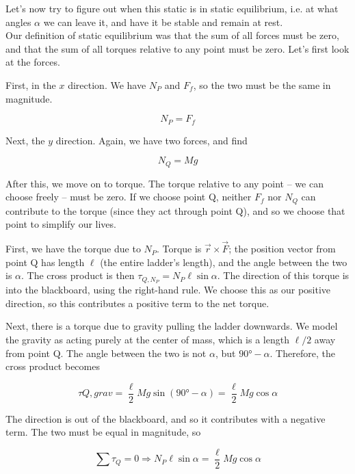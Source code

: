 Let's now try to figure out when this static is in static equilibrium, i.e. at what angles $\alpha$ we can leave it, and have it be stable and remain at rest.\\
Our definition of static equilibrium was that the sum of all forces must be zero, and that the sum of all torques relative to any point must be zero. Let's first look at the forces.

First, in the $x$ direction. We have $N_P$ and $F_f$, so the two must be the same in magnitude.

\begin{equation}
N_P = F_f
\end{equation}

Next, the $y$ direction. Again, we have two forces, and find

\begin{equation}
N_Q = M g
\end{equation}

After this, we move on to torque. The torque relative to any point -- we can choose freely -- must be zero. If we choose point Q, neither $F_f$ nor $N_Q$ can contribute to the torque (since they act through point Q), and so we choose that point to simplify our lives.

First, we have the torque due to $N_P$. Torque is $\vec{r} \times \vec{F}$; the position vector from point Q has length $\ell$ (the entire ladder's length), and the angle between the two is $\alpha$. The cross product is then $\tau_{Q,N_P} = N_P \ell \sin \alpha$. The direction of this torque is into the blackboard, using the right-hand rule. We choose this as our positive direction, so this contributes a positive term to the net torque.

Next, there is a torque due to gravity pulling the ladder downwards. We model the gravity as acting purely at the center of mass, which is a length $\ell/2$ away from point Q. The angle between the two is not $\alpha$, but $\ang{90} - \alpha$. Therefore, the cross product becomes

\begin{equation}
\tau{Q,grav} = \frac{\ell}{2} M g \sin(\ang{90} - \alpha) = \frac{\ell}{2} M g \cos \alpha
\end{equation}

The direction is out of the blackboard, and so it contributes with a negative term. The two must be equal in magnitude, so

\begin{equation}
\sum \tau_Q = 0 \Rightarrow N_P \ell \sin \alpha = \frac{\ell}{2} M g \cos \alpha
\end{equation}

